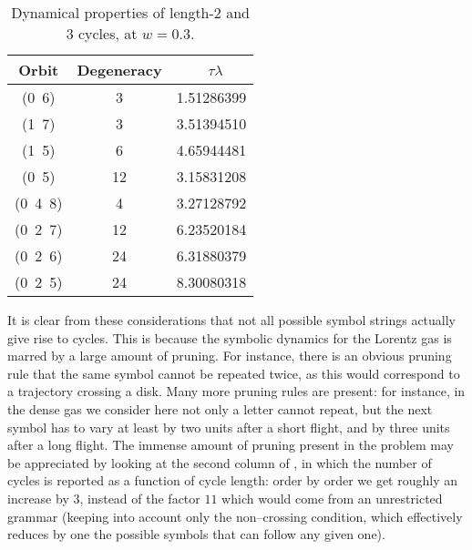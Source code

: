{%
%
%
\begin{table}
{\small
\begin{tabular}{|c|c|c|}
\hline
Orbit & Degeneracy & ~$\tau \lambda$ \\ \hline\hline
(0~6)    & 3      & 1.51286399  \\
(1~7)    & 3      & 3.51394510  \\
(1~5)    & 6      & 4.65944481  \\
(0~5)    & 12     & 3.15831208  \\
(0~4~8) & 4      & 3.27128792  \\
(0~2~7) & 12     & 6.23520184  \\
(0~2~6) & 24     & 6.31880379  \\
(0~2~5) & 24     & 8.30080318  \\ \hline\hline
\end{tabular}
\caption[]{\small
Dynamical properties of length-2 and 3 cycles, at $w=0.3$.
}
\label{t-diff-1}
}  %
\end{table}
%

It is clear from these considerations that not all possible symbol
strings actually give rise to cycles. This is because the symbolic
dynamics for the Lorentz gas is marred by a large amount of pruning.
For instance, there is an obvious pruning rule that the same symbol
cannot be repeated twice, as this would correspond to a trajectory
crossing a disk.  Many more pruning rules are present: for instance,
in the dense gas we consider here not only a letter cannot repeat, but
the next symbol has to vary at least by two units after a short
flight, and by three units after a long flight. The immense amount of
pruning present in the problem may be appreciated by looking at the
second column of ,
in which the number of cycles is reported as a function of cycle
length: order by order we get roughly an increase by $3$, instead of
the factor $11$ which would come from an unrestricted grammar (keeping
into account only the non--crossing condition, which effectively
reduces by one the possible symbols that can follow any given one).


}
